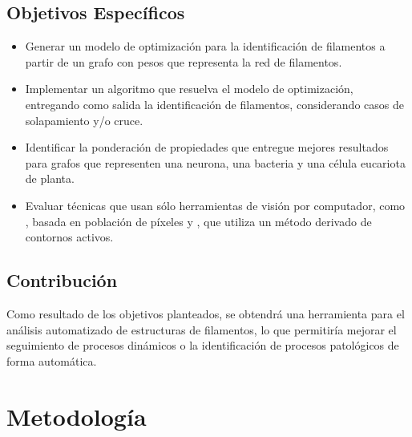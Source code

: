 \documentclass{article}
\begin{document}
\subsection{Objetivos Espec\'ificos}
\begin{itemize}
    \item Generar un modelo de optimizaci\'on para la identificaci\'on de filamentos a partir de un grafo con pesos que representa la red de filamentos.
    \item Implementar un algoritmo que resuelva el modelo de optimizaci\'on, entregando como salida la identificaci\'on de filamentos, considerando casos de solapamiento y/o cruce.
    \item Identificar la ponderaci\'on de propiedades que entregue mejores resultados para grafos que representen una neurona, una bacteria y una c\'elula eucariota de planta.
    \item Evaluar t\'ecnicas que usan s\'olo herramientas de visi\'on por computador, como \cite{boudaoud2014fibriltool}, basada en poblaci\'on de p\'ixeles y \cite{xu2015soax}, que utiliza un m\'etodo derivado de contornos activos. 
    
\end{itemize}

\subsection{Contribuci\'on}

Como resultado de los objetivos planteados, se obtendr\'a una herramienta para el an\'alisis automatizado de estructuras de filamentos, lo que permitir\'ia mejorar el seguimiento de procesos din\'amicos o la identificaci\'on de procesos patol\'ogicos de forma autom\'atica.

\section{Metodolog\'ia}
\end{document}
